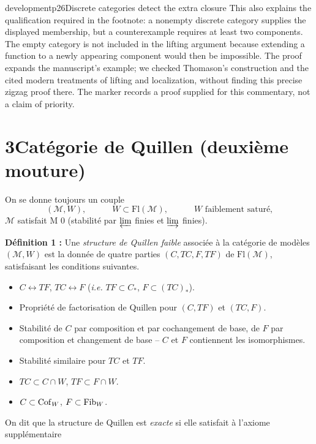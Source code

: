 \begin{dcomment}{development}{p26}{Discrete categories detect the extra closure}
This also explains the qualification required in the footnote: a nonempty discrete category supplies the displayed membership, but a counterexample requires at least two components. The empty category is not included in the lifting argument because extending a function to a newly appearing component would then be impossible. The proof expands the manuscript's example; we checked Thomason's construction and the cited modern treatments of lifting and localization, without finding this precise zigzag proof there. The marker records a proof supplied for this commentary, not a claim of priority.
\end{dcomment}


\section*{3\quad Catégorie de Quillen (deuxième mouture)}

On se donne toujours un couple
\[
(\mathcal{M}, W), \qquad\quad W \subset \mathrm{Fl}(\mathcal{M}), \qquad\quad W \text{ faiblement saturé,}
\]
$\mathcal{M}$ satisfait M 0 (stabilité par $\varprojlim$ finies et $\varinjlim$ finies).

\noindent\textbf{Définition 1 :} Une \textit{structure de Quillen faible} associée à la catégorie de modèles $(\mathcal{M}, W)$ est la donnée de quatre parties $(C, TC, F, TF)$ de $\mathrm{Fl}(\mathcal{M})$, satisfaisant les conditions suivantes.

\begin{itemize}[leftmargin=3em,labelsep=0.5em,align=left]
\item[\textbf{M 1}] $C \longleftrightarrow TF$, $TC \longleftrightarrow F$ (\textit{i.e.} $TF \subset C_*$, $F \subset (TC)_*$).
\item[\textbf{M 2}] Propriété de factorisation de Quillen pour $(C, TF)$ et $(TC, F)$.
\item[\textbf{M 3}] Stabilité de $C$ par composition et par cochangement de base, de $F$ par composition et changement de base -- $C$ et $F$ contiennent les isomorphismes.
\item[\textbf{M 4}] Stabilité similaire pour $TC$ et $TF$.
\item[$\mathbf{M}'$] $TC \subset C \cap W$, $TF \subset F \cap W$.
\item[$\mathbf{M}''$] $C \subset \mathrm{Cof}_W$, $F \subset \mathrm{Fib}_W$.
\end{itemize}

\noindent On dit que la structure de Quillen est \textit{exacte} si elle satisfait à l'axiome supplémentaire

